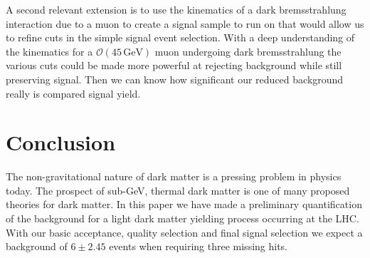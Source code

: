 \documentclass[a4paper,12pt]{article}
\begin{document}
    A second relevant extension is to use the kinematics of a dark
    bremsstrahlung interaction due to a muon to create a signal sample to run on
    that would allow us to refine cuts in the simple signal event selection.
    With a deep understanding of the kinematics for a $\mathcal{O}
    (45\,\text{GeV})$ muon undergoing dark bremsstrahlung the various cuts could
    be made more powerful at rejecting background while still 
    preserving signal. Then we can know how significant our reduced background
    really is compared signal yield.

\section{Conclusion}

    The non-gravitational nature of dark matter is a pressing problem in physics
    today. The prospect of sub-GeV, thermal dark matter is one of many proposed
    theories for dark matter. In this paper we have made a preliminary
    quantification of the background for a light dark matter yielding process
    occurring at the LHC. With our basic acceptance, quality selection and
    final signal selection we expect a background of $6 \pm 2.45$ events when
    requiring three missing hits.

{}

\end{document}
